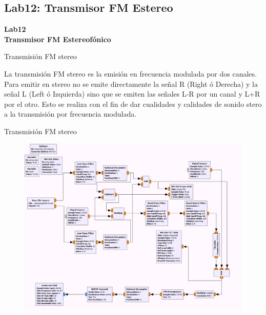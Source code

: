\subsection{Lab12: Transmisor FM Estereo}

\begin{frame}{}


\bfseries{\textrm{\LARGE Lab12\\ \Large Transmisor FM Estereofónico}}
\raggedright
\end{frame}


\begin{frame}{Transmisión FM stereo}


La transmisión FM stereo es la emisión en frecuencia modulada por dos canales. Para emitir en stereo no se emite directamente la señal R (Right ó Derecha) y la señal L (Left ó Izquierda) sino que se emiten las señales L-R por un canal y L+R por el otro. Esto se realiza con el fin de dar cualidades y calidades de sonido stero a la transmisión por frecuencia modulada.

\end{frame}

\begin{frame}{Transmisión FM stereo}
    
\begin{figure}[H]
\centering
\vspace{-3mm}
\includegraphics[width=.8\textwidth]{parte3/lab12/pdf/lab12_1.pdf}
\end{figure}
    
\end{frame}

